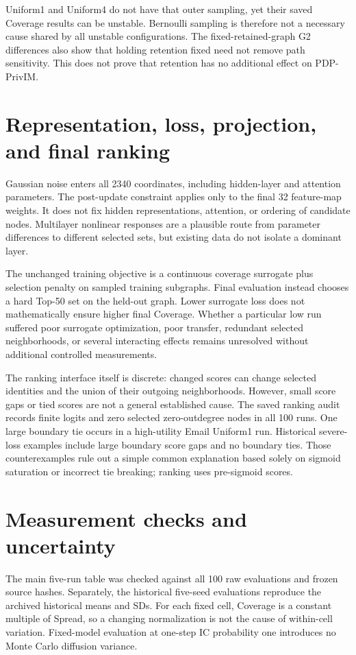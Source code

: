 Uniform1 and Uniform4 do not have that outer sampling, yet their saved Coverage results can be unstable. Bernoulli sampling is therefore not a necessary cause shared by all unstable configurations. The fixed-retained-graph G2 differences also show that holding retention fixed need not remove path sensitivity. This does not prove that retention has no additional effect on PDP-PrivIM.

\section{Representation, loss, projection, and final ranking}
Gaussian noise enters all 2340 coordinates, including hidden-layer and attention parameters. The post-update constraint applies only to the final 32 feature-map weights. It does not fix hidden representations, attention, or ordering of candidate nodes. Multilayer nonlinear responses are a plausible route from parameter differences to different selected sets, but existing data do not isolate a dominant layer.

The unchanged training objective is a continuous coverage surrogate plus selection penalty on sampled training subgraphs. Final evaluation instead chooses a hard Top-50 set on the held-out graph. Lower surrogate loss does not mathematically ensure higher final Coverage. Whether a particular low run suffered poor surrogate optimization, poor transfer, redundant selected neighborhoods, or several interacting effects remains unresolved without additional controlled measurements.

The ranking interface itself is discrete: changed scores can change selected identities and the union of their outgoing neighborhoods. However, small score gaps or tied scores are not a general established cause. The saved ranking audit records finite logits and zero selected zero-outdegree nodes in all 100 runs. One large boundary tie occurs in a high-utility Email Uniform1 run. Historical severe-loss examples include large boundary score gaps and no boundary ties. Those counterexamples rule out a simple common explanation based solely on sigmoid saturation or incorrect tie breaking; ranking uses pre-sigmoid scores.

\section{Measurement checks and uncertainty}
The main five-run table was checked against all 100 raw evaluations and frozen source hashes. Separately, the historical five-seed evaluations reproduce the archived historical means and SDs. For each fixed cell, Coverage is a constant multiple of Spread, so a changing normalization is not the cause of within-cell variation. Fixed-model evaluation at one-step IC probability one introduces no Monte Carlo diffusion variance.

